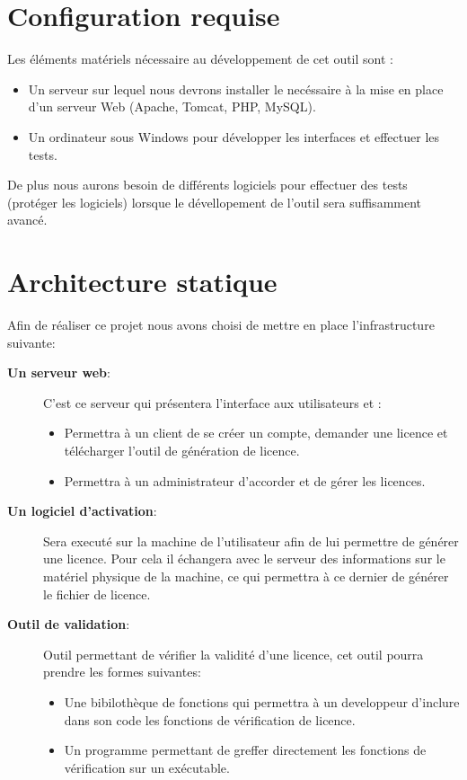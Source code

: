 \chapter{Configuration requise}

Les éléments matériels nécessaire au développement de cet outil sont :
\begin{itemize}
    \item Un serveur sur lequel nous devrons installer le necéssaire à la mise en place d'un
        serveur Web (Apache, Tomcat, PHP, MySQL).
    \item Un ordinateur sous Windows pour développer les interfaces et effectuer les tests.
\end{itemize}

De plus nous aurons besoin de différents logiciels pour effectuer des tests (protéger les
logiciels) lorsque le dévellopement de l'outil sera suffisamment avancé.

\chapter{Architecture statique}
Afin de réaliser ce projet nous avons choisi de mettre en place l'infrastructure suivante:

\begin{description}
	\item[\textbf{Un serveur web}:]
		C'est ce serveur qui présentera l'interface aux utilisateurs et :
		\begin{itemize}
			\item Permettra à un client de se créer un compte, demander une licence et 
			télécharger l'outil de génération de licence.
			\item Permettra à un administrateur d'accorder et de gérer les licences. 
		\end{itemize}
	\item[\textbf{Un logiciel d'activation}:] 
		Sera executé sur la machine de l'utilisateur
		afin de lui permettre de générer une licence. Pour cela il échangera avec
		le serveur des informations sur le matériel physique de la machine, ce 
		qui permettra à ce dernier de générer le fichier de licence.
	\item[\textbf{Outil de validation}:]
		Outil permettant de vérifier la validité d'une licence, cet outil
		pourra prendre les formes suivantes: 
		\begin{itemize}
		\item Une bibilothèque de fonctions qui permettra à un developpeur d'inclure
		dans son code les fonctions de vérification de licence. 
		\item Un programme permettant de greffer directement les fonctions de vérification
		sur un exécutable. 
		\end{itemize}
\end{description}

